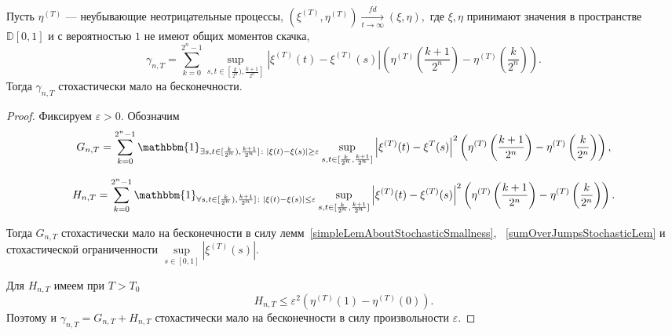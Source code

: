 \documentclass[12pt, a4paper, titlepage]{article}
\begin{document}
 
 \begin{lem}\label{mostSubtleCharacteristicsGammaNTLem}
  Пусть $\eta^{(T)}$ --- неубывающие неотрицательные процессы,
  $(\xi^{(T)}, \eta^{(T)})\xrightarrow[t\to\infty]{fd} (\xi, \eta),$
  где $\xi, \eta$ принимают значения в пространстве $\mathbb{D}[0,1]$
  и с вероятностью $1$ не имеют общих моментов скачка,  
  $$\gamma_{n,T}=\sum\limits_{k=0}^{2^n-1}
  \sup\limits_{s,t \in [\frac{k}{2^n}), \frac{k+1}{2^n}]}
  \left|\xi^{(T)}(t)-\xi^{(T)}(s)\right|
  \left(\eta^{(T)}\left(\frac{k+1}{2^n}\right)-\eta^{(T)}\left(\frac{k}{2^n}\right)\right).$$
    Тогда $\gamma_{n,T}$ стохастически мало на бесконечности. 
 \end{lem}
 \begin{proof}  
 Фиксируем $\varepsilon>0$. Обозначим 
 $$G_{n, T} = \sum\limits_{k=0}^{2^n-1} \mathbbm{1}_{\exists s, t \in [\frac{k}{2^n}), \frac{k+1}{2^n}] \colon
 |\xi(t)-\xi(s)| \ge \varepsilon}
  \sup\limits_{s,t \in [\frac{k}{2^n}, \frac{k+1}{2^n}]}  
   \left|\xi^{(T)}(t)-\xi^{T}(s)\right|^2
  \left(\eta^{(T)}\left(\frac{k+1}{2^n}\right)-\eta^{(T)}\left(\frac{k}{2^n}\right)\right),$$
 
 $$H_{n, T} = \sum\limits_{k=0}^{2^n-1}
  \mathbbm{1}_{\forall s, t \in [\frac{k}{2^n}), \frac{k+1}{2^n}] \colon |\xi(t)-\xi(s)| \le \varepsilon}
  \sup\limits_{s,t \in [\frac{k}{2^n}, \frac{k+1}{2^n}]}  
  \left|\xi^{(T)}(t)-\xi^{(T)}(s)\right|^2
  \left(\eta^{(T)}\left(\frac{k+1}{2^n}\right)-\eta^{(T)}\left(\frac{k}{2^n}\right)\right).$$
  
  Тогда $G_{n, T}$ стохастически мало на бесконечности
  в силу лемм~\ref{simpleLemAboutStochasticSmallness},
  ~\ref{sumOverJumpsStochasticLem} 
  и стохастической ограниченности $\sup\limits_{s\in [0,1]}|\xi^{(T)}(s)|.$
  
  Для $H_{n, T}$ имеем при $T>T_0$
  $$
   H_{n, T} \le \varepsilon^2 \left(\eta^{(T)}(1)-\eta^{(T)}(0)\right).
  $$
  Поэтому и $\gamma_{n,T}=G_{n,T}+H_{n,T}$ стохастически мало на бесконечности
  в силу произвольности $\varepsilon.$ 
 \end{proof}
\end{document}
